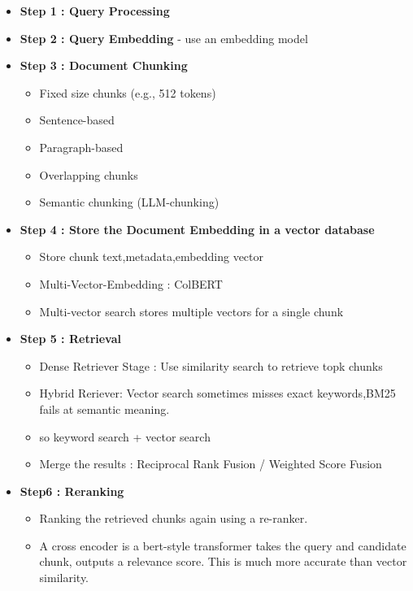 \documentclass[10pt,a4paper]{article}
\begin{document}
\begin{itemize}
    \item \textbf{Step 1 : Query Processing}
    \item \textbf{Step 2 : Query Embedding} - use an embedding model
    \item \textbf{Step 3 : Document Chunking}
    \begin{itemize}
        \item Fixed size chunks (e.g., 512 tokens)
        \item Sentence-based
        \item Paragraph-based
        \item Overlapping chunks
        \item Semantic chunking (LLM-chunking)
    \end{itemize}
    
    \item \textbf{Step 4 : Store the Document Embedding in a vector database}
    \begin{itemize}
        \item Store chunk text,metadata,embedding vector
        \item Multi-Vector-Embedding : ColBERT
        \item Multi-vector search stores multiple vectors for a single chunk
    \end{itemize}
    \item \textbf{Step 5 : Retrieval}
        \begin{itemize}
            \item Dense Retriever Stage : Use similarity search to retrieve topk chunks
            \item Hybrid Reriever: Vector search sometimes misses exact keywords,BM25 fails at semantic meaning.
            \item so keyword search + vector search
            \item Merge the results : Reciprocal Rank Fusion / Weighted Score Fusion
        \end{itemize}
    \item \textbf{Step6 : Reranking}

  \begin{itemize}
  \item
    Ranking the retrieved chunks again using a re-ranker.
  \item
    A cross encoder is a bert-style transformer takes the query and candidate chunk, outputs a relevance score. This is much more accurate than vector similarity.
  \end{itemize}
  

\end{itemize}
\end{document}
